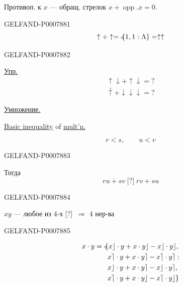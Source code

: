 
Противоп. к \(x\) --- обращ. стрелок\qquad
\(x+\operatorname{opp}.x=0\).


\begin{GelfandAdjacentEvidence}{GELFAND-P000788}{1}
\[
\uparrow+\uparrow=\mathopen{{\scriptstyle\circ}\mkern-5mu\{}1,1:\Lambda\}=\uparrow\uparrow
\]
\end{GelfandAdjacentEvidence}
\begin{GelfandAdjacentEvidence}{GELFAND-P000788}{2}


\underline{\underline{Упр.}}
\begin{gather*}
\uparrow\downarrow+\uparrow\downarrow=?\\
\widehat{\uparrow}+\downarrow\downarrow\downarrow=?
\end{gather*}

\underline{Умножение.}

\underline{Basic inequality} of \underline{mult'n.}

\[
r<s,\qquad u<v
\]
\end{GelfandAdjacentEvidence}
\begin{GelfandAdjacentEvidence}{GELFAND-P000788}{3}


Тогда
\[
ru+sv\mathrel{\text{[?]}}rv+su
\]
\end{GelfandAdjacentEvidence}
\begin{GelfandAdjacentEvidence}{GELFAND-P000788}{4}


\(xy\) --- любое из 4-х \textup{[?]}\ \(\Rightarrow\) 4 нер-ва
\end{GelfandAdjacentEvidence}
\begin{GelfandAdjacentEvidence}{GELFAND-P000788}{5}


\[
\begin{aligned}
x\cdot y={}&\mathopen{{\scriptstyle\circ}\mkern-5mu\{}x\rfloor\cdot y+x\cdot y\rfloor-x\rfloor\cdot y\rfloor,\\
&\phantom{\{}x\rceil\cdot y+x\cdot y\rceil-x\rceil\cdot y\rceil:\\
&\phantom{\{}x\rfloor\cdot y+x\cdot y\rceil-x\rfloor\cdot y\rceil,\\
&\phantom{\{}x\rceil\cdot y+x\cdot y\rfloor-x\rceil\cdot y\rfloor\}
\end{aligned}
\]
\end{GelfandAdjacentEvidence}
